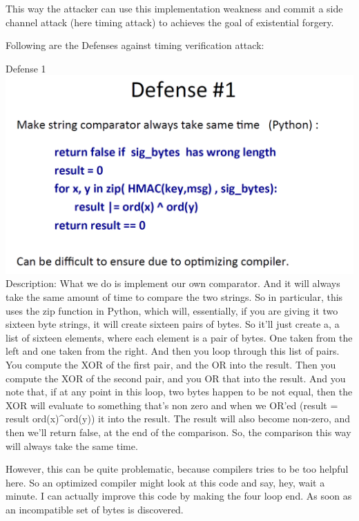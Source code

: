 \documentclass[11pt]{article}
\makeatletter
\def\maxwidth{\ifdim\Gin@nat@width>\linewidth\linewidth
    \else\Gin@nat@width\fi}
\let\Oldincludegraphics\includegraphics
\renewcommand{\includegraphics}[1]{\Oldincludegraphics[width=.8\maxwidth]{#1}}
\makeatother
\begin{document}
This way the attacker can use this implementation weakness and commit a
side channel attack (here timing attack) to achieves the goal of
existential forgery.

Following are the Defenses against timing verification attack:

Defense 1 \includegraphics{./Images/Defense1-VTA.png} Description: What
we do is implement our own comparator. And it will always take the same
amount of time to compare the two strings. So in particular, this uses
the zip function in Python, which will, essentially, if you are giving
it two sixteen byte strings, it will create sixteen pairs of bytes. So
it'll just create a, a list of sixteen elements, where each element is a
pair of bytes. One taken from the left and one taken from the right. And
then you loop through this list of pairs. You compute the XOR of the
first pair, and the OR into the result. Then you compute the XOR of the
second pair, and you OR that into the result. And you note that, if at
any point in this loop, two bytes happen to be not equal, then the XOR
will evaluate to something that's non zero and when we OR'ed (result =
result \textbar{} ord(x)\^{}ord(y)) it into the result. The result will
also become non-zero, and then we'll return false, at the end of the
comparison. So, the comparison this way will always take the same time.

However, this can be quite problematic, because compilers tries to be
too helpful here. So an optimized compiler might look at this code and
say, hey, wait a minute. I can actually improve this code by making the
four loop end. As soon as an incompatible set of bytes is discovered.
\end{document}

